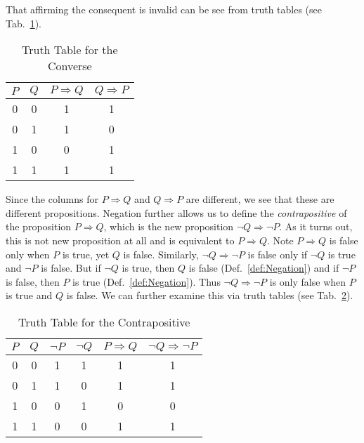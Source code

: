         That affirming the consequent is invalid can be see from truth tables
        (see Tab.~\ref{tab:Truth_Table_Converse}).
        \begin{table}[H]
            \centering
            \captionsetup{type=table}
            \begin{tabular}{c|c|c|c}
                $P$&$Q$&$P\Rightarrow{Q}$&$Q\Rightarrow{P}$\\
                \hline
                0&0&1&1\\
                0&1&1&0\\
                1&0&0&1\\
                1&1&1&1
            \end{tabular}
            \caption{Truth Table for the Converse}
            \label{tab:Truth_Table_Converse}
        \end{table}
        Since the columns for $P\Rightarrow{Q}$ and $Q\Rightarrow{P}$ are
        different, we see that these are different propositions. Negation
        further allows us to define the
        \textit{contrapositive} of the proposition
        $P\Rightarrow{Q}$, which is the new proposition
        $\neg{Q}\Rightarrow\neg{P}$. As it turns out, this is not new
        proposition at all and is equivalent to $P\Rightarrow{Q}$. Note
        $P\Rightarrow{Q}$ is false only when $P$ is true, yet $Q$ is false.
        Similarly, $\neg{Q}\Rightarrow\neg{P}$ is false only if $\neg{Q}$ is
        true and $\neg{P}$ is false. But if $\neg{Q}$ is true, then $Q$ is
        false (Def.~\ref{def:Negation}) and if $\neg{P}$ is false, then $P$ is
        true (Def.~\ref{def:Negation}). Thus $\neg{Q}\Rightarrow\neg{P}$ is only
        false when $P$ is true and $Q$ is false. We can further examine this via
        truth tables (see Tab.~\ref{tab:Truth_Table_for_Contrapositive}).
        \begin{table}[H]
            \centering
            \captionsetup{type=table}
            \begin{tabular}{c|c|c|c|c|c}
                $P$&$Q$&$\neg{P}$&$\neg{Q}$&$P\Rightarrow{Q}$
                    &$\neg{Q}\Rightarrow\neg{P}$\\
                \hline
                0&0&1&1&1&1\\
                0&1&1&0&1&1\\
                1&0&0&1&0&0\\
                1&1&0&0&1&1
            \end{tabular}
            \caption{Truth Table for the Contrapositive}
            \label{tab:Truth_Table_for_Contrapositive}
        \end{table}
